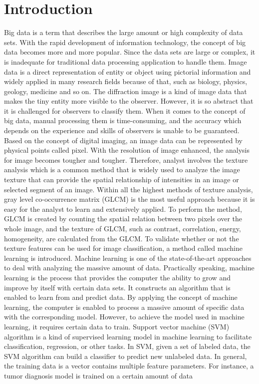 
\renewcommand{\thechapter}{1}

\chapter{Introduction}

Big data is a term that describes the large amount or high complexity of data sets. With the rapid development of information technology, the concept of big data becomes more and more popular. Since the data sets are large or complex, it is inadequate for traditional data processing application to handle them\cite{Snijders}. Image data is a direct representation of entity or object using pictorial information and widely applied in many research fields because of that, such as biology, physics, geology, medicine and so on. The diffraction image is a kind of image data that makes the tiny entity more visible to the observer. However, it is so abstract that it is challenged for observers to classify them. When it comes to the concept of big data, manual processing them is time-consuming, and the accuracy which depends on the experience and skills of observers is unable to be guaranteed. Based on the concept of digital imaging, an image data can be represented by physical points called pixel\cite{Foley}. With the resolution of image enhanced, the analysis for image becomes tougher and tougher. Therefore, analyst involves the texture analysis which is a common method that is widely used to analyze the image texture that can provide the spatial relationship of intensities in an image or selected segment of an image\cite{Linda}. Within all the highest methods of texture analysis, gray level co-occurrence matrix (GLCM) is the most useful approach because it is easy for the analyst to learn and extensively applied\cite{Nanni}. To perform the method, GLCM is created by counting the spatial relation between two pixels over the whole image, and the texture of GLCM, such as contrast, correlation, energy, homogeneity, are calculated from the GLCM. To validate whether or not the texture features can be used for image classification, a method called machine learning is introduced. Machine learning is one of the state-of-the-art approaches to deal with analyzing the massive amount of data. Practically speaking, machine learning is the process that provides the computer the ability to grow and improve by itself with certain data sets\cite{Mitchell}. It constructs an algorithm that is enabled to learn from and predict data\cite{Mehryar}. By applying the concept of machine learning, the computer is enabled to process a massive amount of specific data with the corresponding model. However, to achieve the model used in machine learning, it requires certain data to train. Support vector machine (SVM) algorithm is a kind of supervised learning model in machine learning to facilitate classification, regression, or other tasks\cite{Cortes}. In SVM, given a set of labeled data, the SVM algorithm can build a classifier to predict new unlabeled data. In general, the training data is a vector contains multiple feature parameters. For instance, a tumor diagnosis model is trained on a certain amount of data 